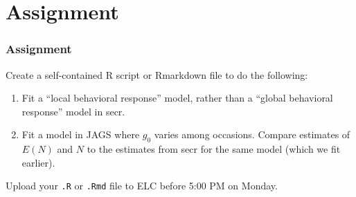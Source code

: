 \documentclass[color=usenames,dvipsnames]{beamer}\usepackage[]{graphicx}\usepackage[]{color}
\begin{document}
\section{Assignment}




\begin{frame}[fragile]
  \frametitle{Assignment}
  Create a self-contained R script or Rmarkdown file to do the
  following: 
  \vfill
  \begin{enumerate}
    \item Fit a ``local behavioral response'' model,
      rather than a ``global behavioral response'' model in secr.
    \item Fit a model in JAGS where $g_0$ varies among
      occasions. Compare estimates of $E(N)$ and $N$ to the estimates
      from secr for the same model (which we fit earlier).
  \end{enumerate}
  \vfill
  Upload your {\tt .R} or {\tt .Rmd} file to ELC before 5:00 PM on Monday. 
\end{frame}
\end{document}
